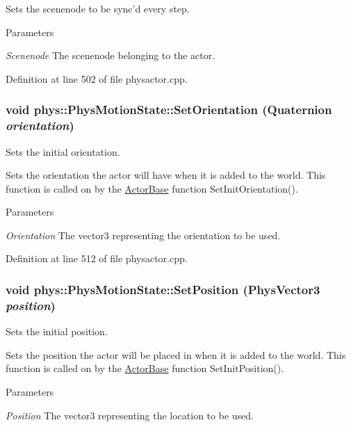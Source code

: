 Sets the scenenode to be sync'd every step. 
\begin{DoxyParams}{Parameters}
\item[{\em Scenenode}]The scenenode belonging to the actor. \end{DoxyParams}


Definition at line 502 of file physactor.cpp.

\hypertarget{classphys_1_1PhysMotionState_ac799070edfea4d1c442e3ed0857bcb1d}{
\subsubsection[{SetOrientation}]{\setlength{\rightskip}{0pt plus 5cm}void phys::PhysMotionState::SetOrientation ({\bf Quaternion} {\em orientation})}}
\label{dc/d0d/classphys_1_1PhysMotionState_ac799070edfea4d1c442e3ed0857bcb1d}


Sets the initial orientation. 

Sets the orientation the actor will have when it is added to the world. This function is called on by the \hyperlink{classphys_1_1ActorBase}{ActorBase} function SetInitOrientation(). 
\begin{DoxyParams}{Parameters}
\item[{\em Orientation}]The vector3 representing the orientation to be used. \end{DoxyParams}


Definition at line 512 of file physactor.cpp.

\hypertarget{classphys_1_1PhysMotionState_a083029e5dbcfafd573d47331ff8660cb}{
\subsubsection[{SetPosition}]{\setlength{\rightskip}{0pt plus 5cm}void phys::PhysMotionState::SetPosition ({\bf PhysVector3} {\em position})}}
\label{dc/d0d/classphys_1_1PhysMotionState_a083029e5dbcfafd573d47331ff8660cb}


Sets the initial position. 

Sets the position the actor will be placed in when it is added to the world. This function is called on by the \hyperlink{classphys_1_1ActorBase}{ActorBase} function SetInitPosition(). 
\begin{DoxyParams}{Parameters}
\item[{\em Position}]The vector3 representing the location to be used. \end{DoxyParams}


